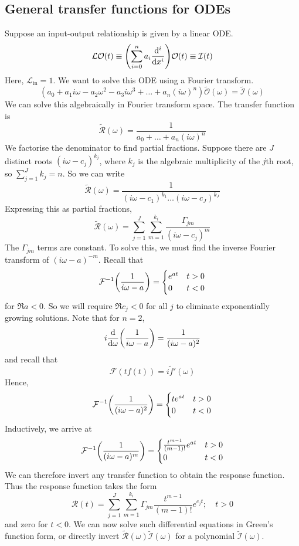 \documentclass[a4paper]{article}
\begin{document}
\subsection{General transfer functions for ODEs}
Suppose an input-output relationship is given by a linear ODE.\@
\[
	\mathcal L \mathcal O(t) \equiv \qty(\sum_{i=0}^n a_i \dv[i]{x}) \mathcal O(t) \equiv \mathcal I(t)
\]
Here, \( \mathcal L_{\text{in}} = 1 \).
We want to solve this ODE using a Fourier transform.
\[
	(a_0 + a_1 i\omega - a_2 \omega^2 - a_3 i\omega^3 + \dots + a_n (i \omega)^n) \widetilde{\mathcal O}(\omega) = \widetilde{\mathcal I}(\omega)
\]
We can solve this algebraically in Fourier transform space.
The transfer function is
\[
	\widetilde{\mathcal R}(\omega) = \frac{1}{a_0 + \dots + a_n (i \omega)^n}
\]
We factorise the denominator to find partial fractions.
Suppose there are \( J \) distinct roots \( (i \omega - c_j)^{k_j} \), where \( k_j \) is the algebraic multiplicity of the \( j \)th root, so \( \sum_{j=1}^J k_j = n \).
So we can write
\[
	\widetilde{\mathcal R}(\omega) = \frac{1}{(i \omega - c_1)^{k_1} \dots (i \omega - c_J)^{k_J}}
\]
Expressing this as partial fractions,
\[
	\widetilde{\mathcal R}(\omega) = \sum_{j=1}^J \sum_{m=1}^{k_i} \frac{\Gamma_{jm}}{(i\omega - c_j)^m}
\]
The \( \Gamma_{jm} \) terms are constant.
To solve this, we must find the inverse Fourier transform of \( (i\omega - a)^{-m} \).
Recall that
\[
	\mathcal F^{-1}\qty(\frac{1}{i\omega - a}) = \begin{cases}
		e^{at} & t > 0 \\
		0      & t < 0
	\end{cases}
\]
for \( \Re a < 0 \).
So we will require \( \Re c_j < 0 \) for all \( j \) to eliminate exponentially growing solutions.
Note that for \( n = 2 \),
\[
	i \dv{\omega} \qty(\frac{1}{i \omega - a}) = \frac{1}{(i \omega-a)^2}
\]
and recall that
\[
	\mathcal F (t f(t)) = i \widetilde{f}'(\omega)
\]
Hence,
\[
	\mathcal F^{-1}\qty(\frac{1}{(i \omega - a)^2}) = \begin{cases}
		t e^{at} & t > 0 \\
		0        & t < 0
	\end{cases}
\]
Inductively, we arrive at
\[
	\mathcal F^{-1}\qty(\frac{1}{(i \omega - a)^m}) = \begin{cases}
		\frac{t^{m-1}}{(m-1)!} e^{at} & t > 0 \\
		0                             & t < 0
	\end{cases}
\]
We can therefore invert any transfer function to obtain the response function.
Thus the response function takes the form
\[
	\mathcal R(t) = \sum_{j=1}^J \sum_{m=1}^{k_i} \Gamma_{jm} \frac{t^{m-1}}{(m-1)!} e^{c_j t};\quad t > 0
\]
and zero for \( t < 0 \).
We can now solve such differential equations in Green's function form, or directly invert \( \widetilde{\mathcal R}(\omega) \widetilde{\mathcal I}(\omega) \) for a polynomial \( \widetilde{\mathcal I}(\omega) \).
\end{document}
